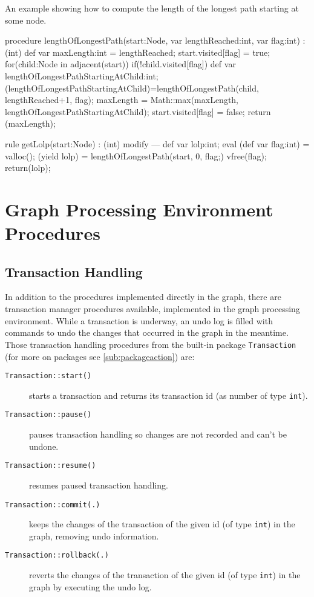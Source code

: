 \begin{example}
An example showing how to compute the length of the longest path starting at some node.
\begin{grgen}
procedure lengthOfLongestPath(start:Node, var lengthReached:int, var flag:int) : (int)
{
	def var maxLength:int = lengthReached;
	start.visited[flag] = true;
	for(child:Node in adjacent(start)) {
		if(!child.visited[flag]) {
			def var lengthOfLongestPathStartingAtChild:int;
			(lengthOfLongestPathStartingAtChild)=lengthOfLongestPath(child, lengthReached+1, flag);
			maxLength = Math::max(maxLength, lengthOfLongestPathStartingAtChild);
		}
	}
	start.visited[flag] = false;
	return (maxLength);
}

rule getLolp(start:Node) : (int)
{
	modify {
	---
		def var lolp:int;
		eval {
			(def var flag:int) = valloc();
			(yield lolp) = lengthOfLongestPath(start, 0, flag;)
			vfree(flag);
		}
		return(lolp);
	}
}
\end{grgen}
\end{example}


\section{Graph Processing Environment Procedures}

\subsection{Transaction Handling}\label{sub:transaction}

In addition to the procedures implemented directly in the graph, there are transaction manager procedures available, implemented in the graph processing environment.
While a transaction is underway, an undo log is filled with commands to undo the changes that occurred in the graph in the meantime.
Those transaction handling procedures from the built-in package \texttt{Transaction} (for more on packages see \ref{sub:packageaction}) are:

\begin{description}
\item[\texttt{Transaction::start()}] starts a transaction and returns its transaction id (as number of type \texttt{int}).
\item[\texttt{Transaction::pause()}] pauses transaction handling so changes are not recorded and can't be undone.
\item[\texttt{Transaction::resume()}] resumes paused transaction handling.
\item[\texttt{Transaction::commit(.)}] keeps the changes of the transaction of the given id (of type \texttt{int}) in the graph, removing undo information.
\item[\texttt{Transaction::rollback(.)}] reverts the changes of the transaction of the given id (of type \texttt{int}) in the graph by executing the undo log.
\end{description}

